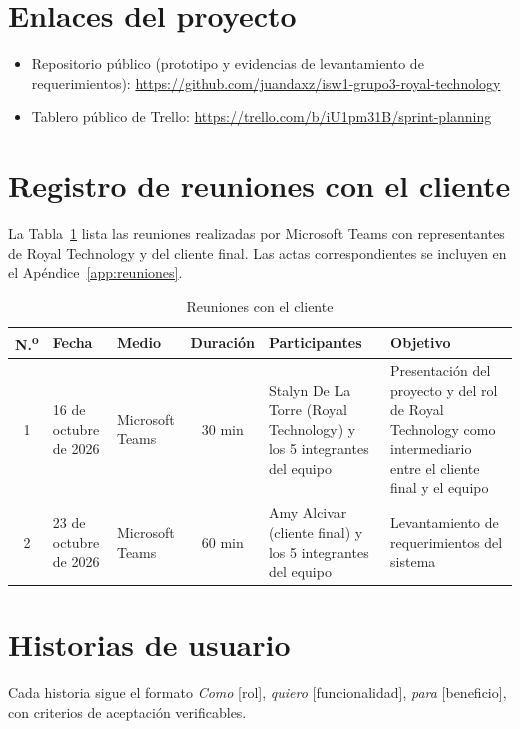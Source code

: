 \documentclass[12pt,a4paper]{article}
\begin{document}
\section{Enlaces del proyecto}\label{sec:enlaces}
\begin{itemize}
  \item Repositorio p\'ublico (prototipo y evidencias de levantamiento de requerimientos): \url{https://github.com/juandaxz/isw1-grupo3-royal-technology}
  \item Tablero p\'ublico de Trello: \url{https://trello.com/b/iU1pm31B/sprint-planning}
\end{itemize}

\section{Registro de reuniones con el cliente}
La Tabla~\ref{tab:reuniones} lista las reuniones realizadas por Microsoft Teams con representantes de Royal Technology y del cliente final. Las actas correspondientes se incluyen en el Ap\'endice~\ref{app:reuniones}.

\begin{table}[H]
\centering
\small
\caption{Reuniones con el cliente}
\label{tab:reuniones}
\setlength{\tabcolsep}{4pt}
\begin{tabular}{c p{2.4cm} p{1.9cm} c p{3.4cm} p{3.4cm}}
\toprule
\textbf{N.\textsuperscript{o}} & \textbf{Fecha} & \textbf{Medio} & \textbf{Duraci\'on} & \textbf{Participantes} & \textbf{Objetivo} \\
\midrule
1 & 16 de octubre de 2026 & Microsoft Teams & 30 min & Stalyn De La Torre (Royal Technology) y los 5 integrantes del equipo & Presentaci\'on del proyecto y del rol de Royal Technology como intermediario entre el cliente final y el equipo \\
2 & 23 de octubre de 2026 & Microsoft Teams & 60 min & Amy Alcivar (cliente final) y los 5 integrantes del equipo & Levantamiento de requerimientos del sistema \\
\bottomrule
\end{tabular}
\end{table}

\appendix
\newpage

\section{Historias de usuario}\label{app:hu}
Cada historia sigue el formato \textit{Como} [rol], \textit{quiero} [funcionalidad], \textit{para} [beneficio], con criterios de aceptaci\'on verificables.
\end{document}
